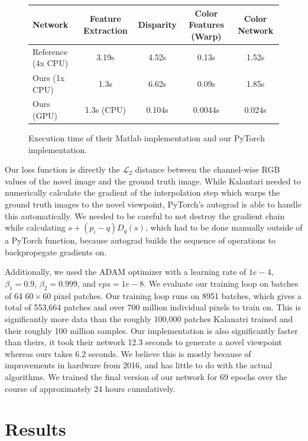 \documentclass[10pt,twocolumn,letterpaper]{article}
\begin{document}
\begin{figure}
\begin{center}
\begin{tabular}{|l | c c c c|}
    \hline
    Network & Feature Extraction & Disparity & Color Features (Warp) & Color Network \\ \hline
    Reference (4x CPU) & 3.19s & 4.52s & 0.13s & 1.52s \\
    Ours (1x CPU) & 1.3s & 6.62s & 0.09s & 1.85s \\
    Ours (GPU) & 1.3s (CPU) & 0.104s & 0.0044s & 0.024s \\ \hline
\end{tabular}
\caption{Execution time of their Matlab implementation and our PyTorch implementation.}
\end{center}
\end{figure}

Our loss function is directly the $\mathcal{L}_2$ distance between the channel-wise RGB values of the novel image
and the ground truth image. While Kalantari \etal needed to numerically calculate the gradient of the interpolation
step which warps the ground truth images to the novel viewpoint, PyTorch's autograd is able to handle this automatically.
We needed to be careful to not destroy the gradient chain while calculating $s + \left(p_i - q\right) D_q(s)$, which had
to be done manually outside of a PyTorch function, because autograd builds the sequence of 
operations to backpropegate gradients on.

Additionally, we used the ADAM optimizer with a learning rate of $1e-4$, $\beta_1 = 0.9$, $\beta_2 = 0.999$, and $eps = 1e-8$.
We evaluate our training loop on batches of 64 $60 \times 60$ pixel patches. 
Our training loop runs on 8951 batches, which gives a total of 553,664 patches and over 700 million
individual pixels to train on. 
This is significantly more data than the roughly 100,000 patches Kalanatri \etal trained and their roughly 100 million samples.
Our implementation is also significantly faster than theirs, it took their network 12.3 seconds to generate a novel viewpoint
whereas ours takes 6.2 seconds. We believe this is mostly because of improvements in hardware from 2016, and has little to do with the
actual algorithms. We trained the final version of our network for 69 epochs over the course of approximately 24 hours cumulatively.

\section{Results}
\end{document}
